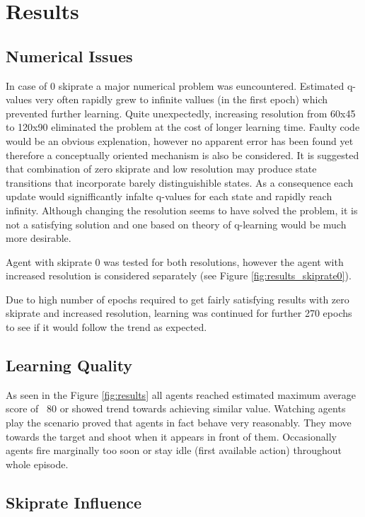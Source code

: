 \section{Results}
	\subsection{Numerical Issues}
		In case of 0 skiprate a major numerical problem was euncountered. Estimated q-values very often rapidly grew to infinite vallues (in the first epoch) which prevented further learning. Quite unexpectedly, increasing resolution from 60x45 to 120x90 eliminated the problem at the cost of longer learning time. Faulty code would be an obvious explenation, however no apparent error has been found yet therefore a conceptually oriented mechanism is also be considered. It is suggested that combination of zero skiprate and low resolution may produce state transitions that incorporate barely distinguishible states. As a consequence each update would signifficantly infalte q-values for each state and rapidly reach infinity. Although changing the resolution seems to have solved the problem, it is not a satisfying solution and one based on theory of q-learning would be much more desirable.

		Agent with skiprate 0 was tested for both resolutions, however the agent with increased resolution is considered separately (see Figure \ref{fig:results_skiprate0}).

		Due to high number of epochs required to get fairly satisfying results with zero skiprate and increased resolution, learning was continued for further 270 epochs to see if it would follow the trend as expected.

	\subsection{Learning Quality}
		As seen in the Figure \ref{fig:results} all agents reached estimated maximum average score of ~80 or showed trend towards achieving similar value. Watching agents play the scenario proved that agents in fact behave very reasonably. They move towards the target and shoot when it appears in front of them. Occasionally agents fire marginally too soon or stay idle (first available action) throughout whole episode. 

	\subsection{Skiprate Influence}
		
